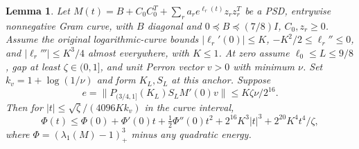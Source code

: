 \documentclass[11pt]{amsart}
\newtheorem{lemma}[theorem]{Lemma}
\theoremstyle{remark}\newtheorem{remark}[theorem]{Remark}
\begin{document}
\begin{lemma}\label{lem:generalizedperron}
Let $M(t)=B+C_0C_0^T+\sum_r a_re^{\ell_r(t)}z_rz_r^T$ be a PSD,
entrywise nonnegative Gram curve, with $B$ diagonal and
$0\preceq B\preceq(7/8)I$, $C_0,z_r\ge0$.
Assume the original logarithmic-curve bounds
$|\ell_r'(0)|\le K$, $-K^2/2\le\ell_r''\le0$, and
$|\ell_r'''|\le K^3/4$ almost everywhere, with $K\le1$.
At zero assume $\ell_0\le L\le9/8$, gap at least
$\zeta\in(0,1]$, and unit Perron vector $v>0$ with minimum $\nu$.
Set $k_v=1+\log(1/\nu)$ and form $K_L,S_L$ at this anchor.
Suppose
\[
 e=\|P_{(3/4,1]}(K_L)S_LM'(0)v\|
       \le K\zeta\nu/2^{16}.
\]
Then for $|t|\le\sqrt\zeta/(4096Kk_v)$ in the curve interval,
\[
 \Phi(t)\le\Phi(0)+\Phi'(0)t+\tfrac12\Phi''(0)t^2
        +2^{16}K^3|t|^3+2^{20}K^4t^4/\zeta,
\]
where $\Phi=(\lambda_1(M)-1)_+^3$ minus any quadratic energy.
\end{lemma}
\end{document}
